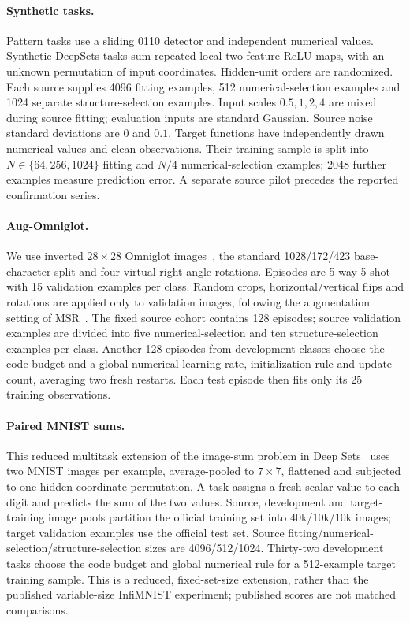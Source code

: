 \paragraph{Synthetic tasks.}
Pattern tasks use a sliding 0110 detector and independent numerical
values. Synthetic DeepSets tasks sum repeated local two-feature ReLU
maps, with an unknown permutation of input coordinates. Hidden-unit
orders are randomized. Each source supplies 4096 fitting examples,
512 numerical-selection examples and 1024 separate structure-selection
examples. Input scales $0.5,1,2,4$ are mixed during source fitting;
evaluation inputs are standard Gaussian. Source noise standard
deviations are $0$ and $0.1$. Target functions have independently drawn
numerical values and clean observations. Their training sample is split
into $N\in\{64,256,1024\}$ fitting and $N/4$ numerical-selection
examples; 2048 further examples measure prediction error. A separate
source pilot precedes the reported confirmation series.

\paragraph{Aug-Omniglot.}
We use inverted $28\times28$ Omniglot images~\cite{lake2015human},
the standard 1028/172/423 base-character split and four virtual
right-angle rotations. Episodes are 5-way 5-shot with 15 validation
examples per class. Random crops, horizontal/vertical flips and
rotations are applied only to validation images, following the
augmentation setting of MSR~\cite{zhou2021meta}.
The fixed source cohort contains 128 episodes; source validation
examples are divided into five numerical-selection and ten structure-selection
examples per class. Another 128 episodes from development classes
choose the code budget and a global numerical learning rate,
initialization rule and update count, averaging two fresh restarts.
Each test episode then fits only its 25 training observations.

\paragraph{Paired MNIST sums.}
This reduced multitask extension of the image-sum problem in
Deep Sets~\cite{zaheer2017deep} uses two MNIST images per example,
average-pooled to $7\times7$, flattened and subjected to one hidden
coordinate permutation. A task assigns a fresh scalar value to each
digit and predicts the sum of the two values. Source, development and
target-training image pools partition the official training set into
40k/10k/10k images; target validation examples use the official test set.
Source fitting/numerical-selection/structure-selection sizes are
4096/512/1024. Thirty-two development tasks choose the code budget and
global numerical rule for a 512-example target training sample.
This is a reduced,
fixed-set-size extension, rather than the published variable-size
InfiMNIST experiment; published scores are not matched comparisons.

